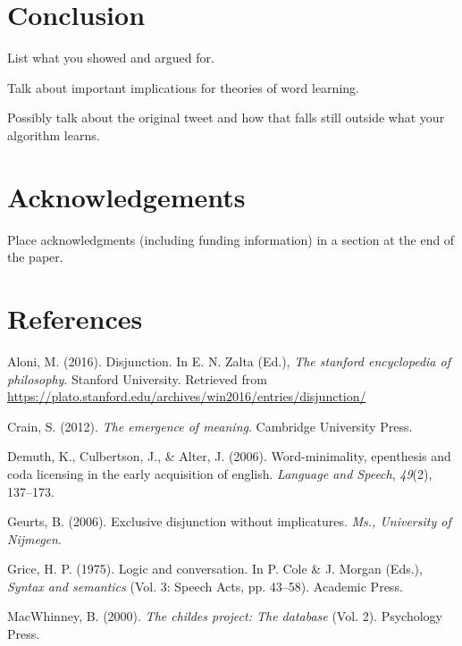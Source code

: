\documentclass[10pt, letterpaper]{article}
\begin{document}
\section{Conclusion}\label{conclusion}

List what you showed and argued for.

Talk about important implications for theories of word learning.

Possibly talk about the original tweet and how that falls still outside
what your algorithm learns.

\section{Acknowledgements}\label{acknowledgements}

Place acknowledgments (including funding information) in a section at
the end of the paper.

\section{References}\label{references}

\setlength{\parindent}{-0.1in} \setlength{\leftskip}{0.125in} \noindent

\hypertarget{refs}{}
\hypertarget{ref-Aloni2016}{}
Aloni, M. (2016). Disjunction. In E. N. Zalta (Ed.), \emph{The stanford
encyclopedia of philosophy}. Stanford University. Retrieved from
\url{https://plato.stanford.edu/archives/win2016/entries/disjunction/}

\hypertarget{ref-crain2012emergence}{}
Crain, S. (2012). \emph{The emergence of meaning}. Cambridge University
Press.

\hypertarget{ref-demuth2006word}{}
Demuth, K., Culbertson, J., \& Alter, J. (2006). Word-minimality,
epenthesis and coda licensing in the early acquisition of english.
\emph{Language and Speech}, \emph{49}(2), 137--173.

\hypertarget{ref-geurts2006exclusive}{}
Geurts, B. (2006). Exclusive disjunction without implicatures.
\emph{Ms., University of Nijmegen}.

\hypertarget{ref-grice1975logicconvo}{}
Grice, H. P. (1975). Logic and conversation. In P. Cole \& J. Morgan
(Eds.), \emph{Syntax and semantics} (Vol. 3: Speech Acts, pp. 43--58).
Academic Press.

\hypertarget{ref-macwhinney2000childes}{}
MacWhinney, B. (2000). \emph{The childes project: The database} (Vol.
2). Psychology Press.
\end{document}

